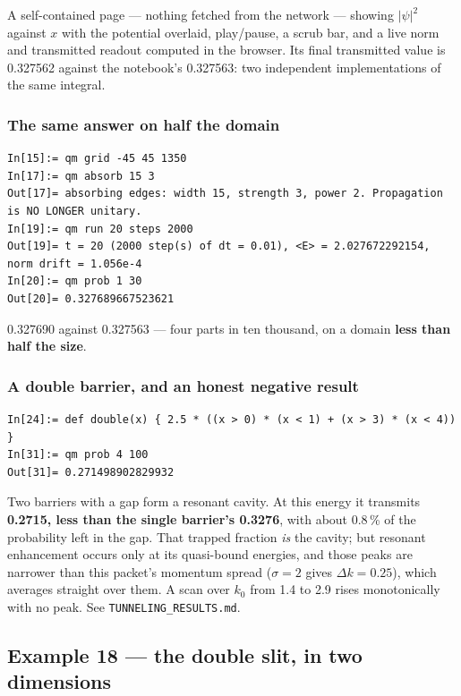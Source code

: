 \documentclass[11pt]{article}
\newcommand{\code}[1]{\texttt{#1}}
\begin{document}
A self-contained page --- nothing fetched from the network --- showing
$|\psi|^2$ against $x$ with the potential overlaid, play/pause, a scrub
bar, and a live norm and transmitted readout computed in the browser.
Its final transmitted value is 0.327562 against the notebook's 0.327563:
two independent implementations of the same integral.

\subsubsection*{The same answer on half the domain}

\begin{lstlisting}
In[15]:= qm grid -45 45 1350
In[17]:= qm absorb 15 3
Out[17]= absorbing edges: width 15, strength 3, power 2. Propagation is NO LONGER unitary.
In[19]:= qm run 20 steps 2000
Out[19]= t = 20 (2000 step(s) of dt = 0.01), <E> = 2.027672292154, norm drift = 1.056e-4
In[20]:= qm prob 1 30
Out[20]= 0.327689667523621
\end{lstlisting}

0.327690 against 0.327563 --- four parts in ten thousand, on a domain
\textbf{less than half the size}.

\subsubsection*{A double barrier, and an honest negative result}

\begin{lstlisting}
In[24]:= def double(x) { 2.5 * ((x > 0) * (x < 1) + (x > 3) * (x < 4)) }
In[31]:= qm prob 4 100
Out[31]= 0.271498902829932
\end{lstlisting}

Two barriers with a gap form a resonant cavity. At this energy it
transmits \textbf{0.2715, less than the single barrier's 0.3276}, with
about 0.8\,\% of the probability left in the gap. That trapped fraction
\emph{is} the cavity; but resonant enhancement occurs only at its
quasi-bound energies, and those peaks are narrower than this packet's
momentum spread ($\sigma=2$ gives $\Delta k=0.25$), which averages
straight over them. A scan over $k_0$ from 1.4 to 2.9 rises
monotonically with no peak. See \code{TUNNELING\_RESULTS.md}.

\subsection{Example 18 --- the double slit, in two dimensions}
\end{document}
